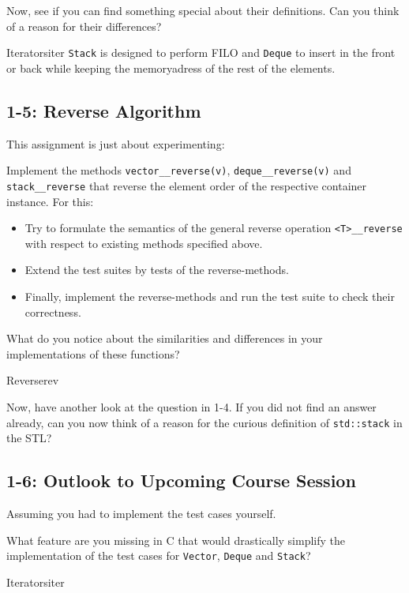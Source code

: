 \documentclass[]{article}
\providecommand{\tightlist}{%
  \setlength{\itemsep}{0pt}\setlength{\parskip}{0pt}}
\begin{document}
Now, see if you can find something special about their definitions. Can
you think of a reason for their differences?
  \begin{example}{Iterators}{iter}
        \texttt{Stack} is designed to perform FILO and \texttt{Deque} to insert
        in the front or back while keeping the memoryadress of the rest of the
        elements.
  \end{example}

\subsection{1-5: Reverse Algorithm}\label{reverse-algorithm}

This assignment is just about experimenting:

Implement the methods \texttt{vector\_\_reverse(v)},
\texttt{deque\_\_reverse(v)} and \texttt{stack\_\_reverse} that reverse
the element order of the respective container instance. For this:

\begin{itemize}
\tightlist
\item
  Try to formulate the semantics of the general reverse operation
  \texttt{\textless{}T\textgreater{}\_\_reverse} with respect to
  existing methods specified above.
\item
  Extend the test suites by tests of the reverse-methods.
\item
  Finally, implement the reverse-methods and run the test suite to check
  their correctness.
\end{itemize}

What do you notice about the similarities and differences in your
implementations of these functions?
  \begin{example}{Reverse}{rev}

  \end{example}

Now, have another look at the question in 1-4. If you did not find an
answer already, can you now think of a reason for the curious definition
of \texttt{std::stack} in the STL?

\subsection{1-6: Outlook to Upcoming Course
Session}\label{outlook-to-upcoming-course-session}

Assuming you had to implement the test cases yourself.

What feature are you missing in C that would drastically simplify the
implementation of the test cases for \texttt{Vector}, \texttt{Deque} and
\texttt{Stack}?
  \begin{example}{Iterators}{iter}
    
  \end{example}
\end{document}
